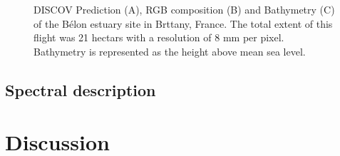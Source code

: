 \documentclass[
  letterpaper,
  DIV=11,
  numbers=noendperiod]{scrartcl}
\begin{document}
\label{cell-fig-Belon}
\begin{figure}[H]


\caption{\label{fig-Belon}DISCOV Prediction (A), RGB composition (B) and
Bathymetry (C) of the Bélon estuary site in Brttany, France. The total
extent of this flight was 21 hectars with a resolution of 8 mm per
pixel. Bathymetry is represented as the height above mean sea level.}

\end{figure}%

\subsection{Spectral description}\label{spectral-description}

\section{Discussion}\label{discussion}
\end{document}
